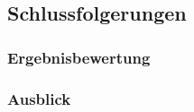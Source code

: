 
\newpage


\newpage


\newpage


\newpage


\newpage


\newpage


\subsection{Schlussfolgerungen}
\subsubsection{Ergebnisbewertung}
\subsubsection{Ausblick}